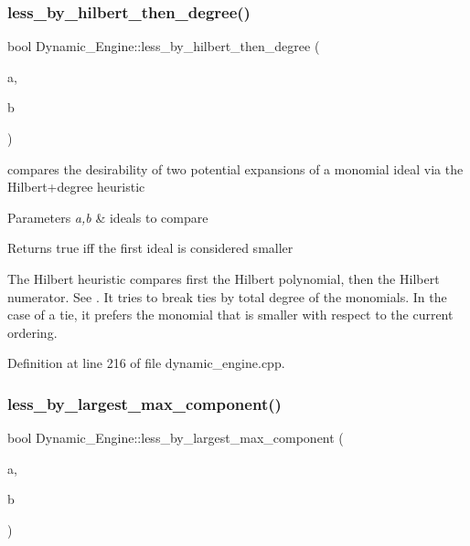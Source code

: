 \subsubsection{\texorpdfstring{less\+\_\+by\+\_\+hilbert\+\_\+then\+\_\+degree()}{less\_by\_hilbert\_then\_degree()}}
{\footnotesize\ttfamily bool Dynamic\+\_\+\+Engine\+::less\+\_\+by\+\_\+hilbert\+\_\+then\+\_\+degree (\begin{DoxyParamCaption}\item[{\hyperlink{group___g_b_computation_class_dynamic___engine_1_1_p_p___with___ideal}{P\+P\+\_\+\+With\+\_\+\+Ideal} \&}]{a,  }\item[{\hyperlink{group___g_b_computation_class_dynamic___engine_1_1_p_p___with___ideal}{P\+P\+\_\+\+With\+\_\+\+Ideal} \&}]{b }\end{DoxyParamCaption})}



compares the desirability of two potential expansions of a monomial ideal via the Hilbert+degree heuristic 


\begin{DoxyParams}{Parameters}
{\em a,b} & ideals to compare \\
\hline
\end{DoxyParams}
\begin{DoxyReturn}{Returns}
{\ttfamily true} iff the first ideal is considered smaller
\end{DoxyReturn}
The Hilbert heuristic compares first the Hilbert polynomial, then the Hilbert numerator. See \cite{CaboaraDynAlg}. It tries to break ties by total degree of the monomials. In the case of a tie, it prefers the monomial that is smaller with respect to the current ordering. 

Definition at line 216 of file dynamic\+\_\+engine.\+cpp.

\mbox{\label{namespace_dynamic___engine_acbc39a829236f4021485cc631f030264}} 
\subsubsection{\texorpdfstring{less\+\_\+by\+\_\+largest\+\_\+max\+\_\+component()}{less\_by\_largest\_max\_component()}}
{\footnotesize\ttfamily bool Dynamic\+\_\+\+Engine\+::less\+\_\+by\+\_\+largest\+\_\+max\+\_\+component (\begin{DoxyParamCaption}\item[{\hyperlink{group___g_b_computation_class_dynamic___engine_1_1_p_p___with___ideal}{P\+P\+\_\+\+With\+\_\+\+Ideal} \&}]{a,  }\item[{\hyperlink{group___g_b_computation_class_dynamic___engine_1_1_p_p___with___ideal}{P\+P\+\_\+\+With\+\_\+\+Ideal} \&}]{b }\end{DoxyParamCaption})}



